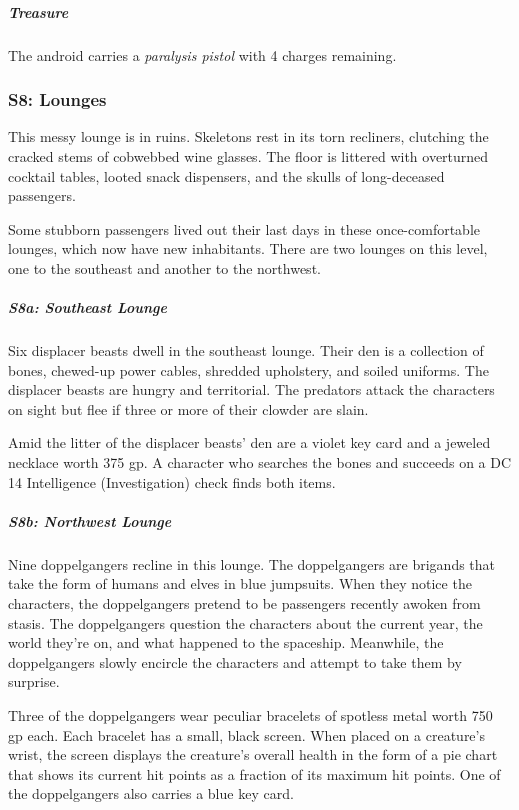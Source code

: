 \documentclass[10pt,a4paper,twoside,bg=print,twocolumn,openany,nodeprecatedcode]{dndbook}
\begin{document}
\subparagraph{Treasure}
The android carries a \textit{paralysis pistol} with 4 charges remaining.

\subsubsection{S8: Lounges}
\begin{DndReadAloud}{}
This messy lounge is in ruins. Skeletons rest in its torn recliners, clutching the cracked stems of cobwebbed wine glasses. The floor is littered with overturned cocktail tables, looted snack dispensers, and the skulls of long-deceased passengers.

\end{DndReadAloud}

Some stubborn passengers lived out their last days in these once-comfortable lounges, which now have new inhabitants. There are two lounges on this level, one to the southeast and another to the northwest.

\subparagraph{S8a: Southeast Lounge}
Six displacer beasts dwell in the southeast lounge. Their den is a collection of bones, chewed-up power cables, shredded upholstery, and soiled uniforms. The displacer beasts are hungry and territorial. The predators attack the characters on sight but flee if three or more of their clowder are slain.

Amid the litter of the displacer beasts' den are a violet key card and a jeweled necklace worth 375 gp. A character who searches the bones and succeeds on a DC 14 Intelligence (Investigation) check finds both items.

\subparagraph{S8b: Northwest Lounge}
Nine doppelgangers recline in this lounge. The doppelgangers are brigands that take the form of humans and elves in blue jumpsuits. When they notice the characters, the doppelgangers pretend to be passengers recently awoken from stasis. The doppelgangers question the characters about the current year, the world they're on, and what happened to the spaceship. Meanwhile, the doppelgangers slowly encircle the characters and attempt to take them by surprise.

Three of the doppelgangers wear peculiar bracelets of spotless metal worth 750 gp each. Each bracelet has a small, black screen. When placed on a creature's wrist, the screen displays the creature's overall health in the form of a pie chart that shows its current hit points as a fraction of its maximum hit points. One of the doppelgangers also carries a blue key card.
\end{document}
